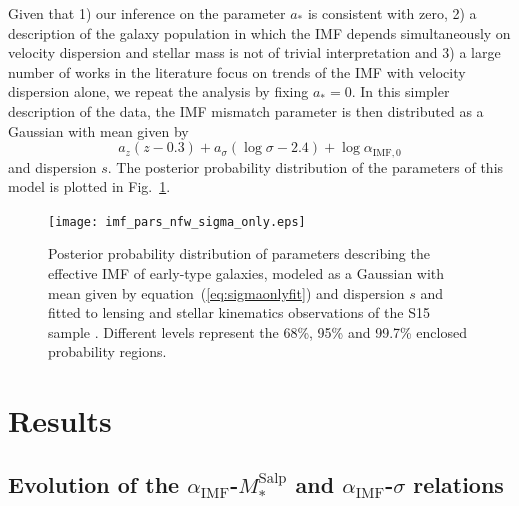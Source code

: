 \documentclass[usenatbib]{mnras}
\def\msalp{M_*^{\mathrm{Salp}}}
\def\aimf{\alpha_{\mathrm{IMF}}}
\def\Fref#1{Fig.~\ref{#1}\xspace}
\def\Eref#1{equation~(\ref{#1})\xspace}
\begin{document}
Given that 1) our inference on the parameter $a_*$ is consistent with zero, 2) a description of the galaxy population in which the IMF depends simultaneously on velocity dispersion and stellar mass is not of trivial interpretation and 3) a large number of works in the literature focus on trends of the IMF with velocity dispersion alone, we repeat the analysis by fixing $a_*=0$. 
In this simpler description of the data, the IMF mismatch parameter is then distributed as a Gaussian with mean given by
%
\begin{equation}\label{eq:sigmaonlyfit}
a_z(z - 0.3) + a_\sigma(\log{\sigma} - 2.4) + \log{\alpha_{\mathrm{IMF},0}}
\end{equation}
%
and dispersion $s$.
The posterior probability distribution of the parameters of this model is plotted in \Fref{fig:sigmaonlycorner}. 
%
\begin{figure}
 \texttt{[image: imf\_pars\_nfw\_sigma\_only.eps]}
 \caption{
Posterior probability distribution of parameters describing
   the effective IMF of early-type galaxies, modeled as a Gaussian with mean given by \Eref{eq:sigmaonlyfit} and dispersion $s$ and fitted to 
   lensing and stellar kinematics observations of the S15 sample
   . Different levels represent the 68\%, 95\% and
   99.7\% enclosed probability regions.
}
 \label{fig:sigmaonlycorner}
\end{figure}
%


\section{Results}\label{sect:results}

\subsection{Evolution of the $\aimf$-$\msalp$ and $\aimf$-$\sigma$ relations}
\end{document}
